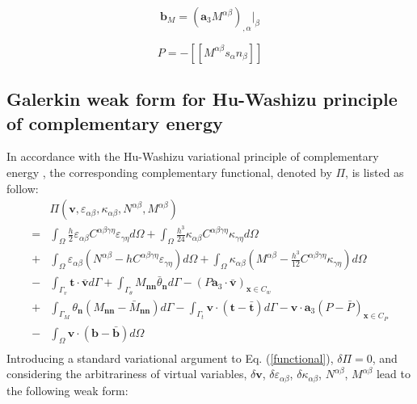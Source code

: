 \begin{equation}
\boldsymbol b_M = (\boldsymbol a_3 M^{\alpha\beta})_{,\alpha}\vert_\beta
\end{equation}

\begin{equation}
P = -[[M^{\alpha\beta}s_\alpha n_\beta]]
\end{equation}

\subsection{Galerkin weak form for Hu-Washizu principle of complementary energy}
In accordance with the Hu-Washizu variational principle of complementary energy \cite{dah-wei1985}, the corresponding complementary functional, denoted by $\Pi$, is listed as follow:
\begin{equation} \label{functional}
\begin{split}
&\Pi(\boldsymbol v, \varepsilon_{\alpha\beta},\kappa_{\alpha\beta},N^{\alpha\beta},M^{\alpha\beta}) \\
= &\int_\Omega \frac{h}{2}\varepsilon_{\alpha\beta} C^{\alpha\beta\gamma\eta}\varepsilon_{\gamma\eta}d\Omega 
+ \int_\Omega \frac{h^3}{24}\kappa_{\alpha\beta} C^{\alpha\beta\gamma\eta}\kappa_{\gamma\eta}d\Omega \\
+& \int_\Omega \varepsilon_{\alpha\beta} (N^{\alpha\beta} - h C^{\alpha\beta\gamma\eta} \varepsilon_{\gamma\eta}) d\Omega
+ \int_\Omega \kappa_{\alpha\beta} (M^{\alpha\beta} - \frac{h^3}{12} C^{\alpha\beta\gamma\eta} \kappa_{\gamma\eta}) d\Omega \\
-& \int_{\Gamma_v} \boldsymbol t \cdot \bar{\boldsymbol v} d\Gamma 
+ \int_{\Gamma_\theta} M_{\boldsymbol{nn}} \bar \theta_{\boldsymbol n} d\Gamma - (P \boldsymbol a_3 \cdot \bar{\boldsymbol v})_{\boldsymbol x \in C_w} \\
+ &\int_{\Gamma_M} \theta_{\boldsymbol n} (M_{\boldsymbol{nn}} - \bar M_{\boldsymbol{nn}}) d\Gamma
- \int_{\Gamma_t} \boldsymbol v \cdot (\boldsymbol t - \bar{\boldsymbol t})d\Gamma - \boldsymbol v \cdot \boldsymbol a_3 (P - \bar{P})_{\boldsymbol x \in C_P} \\
- &\int_\Omega \boldsymbol v \cdot (\boldsymbol b - \bar{\boldsymbol b}) d\Omega \\
\end{split}
\end{equation}
Introducing a standard variational argument to Eq. (\ref{functional}), $\delta \Pi=0$, and considering the arbitrariness of virtual variables, $\delta \boldsymbol v$, $\delta \varepsilon_{\alpha\beta}$, $\delta \kappa_{\alpha\beta}$, $N^{\alpha\beta}$, $M^{\alpha\beta}$ lead to the following weak form:
